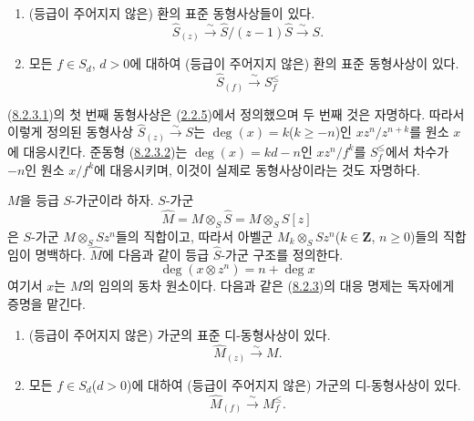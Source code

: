 \begin{lemma}[8.2.3]
\label{II.8.2.3-ko}
\begin{enumerate}
\item[\rm(i)] (등급이 주어지지 않은) 환의 표준 동형사상들이 있다.
\begin{equation}
\label{II.8.2.3.1-ko}
  \widehat{S}_{(z)}\xrightarrow{\sim}
  \widehat{S}/(z-1)\widehat{S}\xrightarrow{\sim}S.
\tag{8.2.3.1}
\end{equation}
\item[\rm(ii)] 모든 $f\in S_d$, $d>0$에 대하여 (등급이 주어지지 않은)
환의 표준 동형사상이 있다.
\begin{equation}
\label{II.8.2.3.2-ko}
  \widehat{S}_{(f)}\xrightarrow{\sim}S_f^{\leq}
\tag{8.2.3.2}
\end{equation}
\end{enumerate}
\end{lemma}

(\hyperref[II.8.2.3.1-ko]{8.2.3.1})의 첫 번째 동형사상은
(\hyperref[II.2.2.5-ko]{2.2.5})에서 정의했으며 두 번째 것은 자명하다.
따라서 이렇게 정의된 동형사상
$\widehat{S}_{(z)}\xrightarrow{\sim}S$는 $\deg(x)=k$($k\geq-n$)인
$xz^n/z^{n+k}$를 원소 $x$에 대응시킨다. 준동형
(\hyperref[II.8.2.3.2-ko]{8.2.3.2})는 $\deg(x)=kd-n$인 $xz^n/f^k$를
$S_f^{\leq}$에서 차수가 $-n$인 원소 $x/f^k$에 대응시키며, 이것이
실제로 동형사상이라는 것도 자명하다.

\begin{env}[8.2.4]
\label{II.8.2.4-ko}
$M$을 등급 $S$-가군이라 하자. $S$-가군
\begin{equation}
\label{II.8.2.4.1-ko}
  \widehat{M}=M\otimes_S\widehat{S}=M\otimes_S S[z]
\tag{8.2.4.1}
\end{equation}
은 $S$-가군 $M\otimes_S Sz^n$들의 직합이고, 따라서 아벨군
$M_k\otimes_S Sz^n$($k\in\mathbf{Z}$, $n\geq0$)들의 직합임이 명백하다.
$\widehat{M}$에 다음과 같이 등급 $\widehat{S}$-가군 구조를 정의한다.
\begin{equation}
\label{II.8.2.4.2-ko}
  \deg(x\otimes z^n)=n+\deg x
\tag{8.2.4.2}
\end{equation}
여기서 $x$는 $M$의 임의의 동차 원소이다. 다음과 같은
(\hyperref[II.8.2.3-ko]{8.2.3})의 대응 명제는 독자에게 증명을 맡긴다.
\end{env}

\begin{lemma}[8.2.5]
\label{II.8.2.5-ko}
\begin{enumerate}
\item[\rm(i)] (등급이 주어지지 않은) 가군의 표준 디-동형사상이 있다.
\begin{equation}
\label{II.8.2.5.1-ko}
  \widehat{M}_{(z)}\xrightarrow{\sim}M.
\tag{8.2.5.1}
\end{equation}
\item[\rm(ii)] 모든 $f\in S_d$($d>0$)에 대하여 (등급이 주어지지 않은)
가군의 디-동형사상이 있다.
\begin{equation}
\label{II.8.2.5.2-ko}
  \widehat{M}_{(f)}\xrightarrow{\sim}M_f^{\leq}.
\tag{8.2.5.2}
\end{equation}
\end{enumerate}
\end{lemma}

